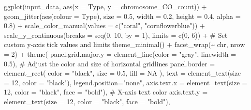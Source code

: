 \documentclass[
  letterpaper,
  DIV=11,
  numbers=noendperiod]{scrreprt}
\newenvironment{Shaded}{\begin{snugshade}}{\end{snugshade}}
\newcommand{\AttributeTok}[1]{\textcolor[rgb]{0.40,0.45,0.13}{#1}}
\newcommand{\CommentTok}[1]{\textcolor[rgb]{0.37,0.37,0.37}{#1}}
\newcommand{\ConstantTok}[1]{\textcolor[rgb]{0.56,0.35,0.01}{#1}}
\newcommand{\DecValTok}[1]{\textcolor[rgb]{0.68,0.00,0.00}{#1}}
\newcommand{\FloatTok}[1]{\textcolor[rgb]{0.68,0.00,0.00}{#1}}
\newcommand{\FunctionTok}[1]{\textcolor[rgb]{0.28,0.35,0.67}{#1}}
\newcommand{\NormalTok}[1]{\textcolor[rgb]{0.00,0.23,0.31}{#1}}
\newcommand{\SpecialCharTok}[1]{\textcolor[rgb]{0.37,0.37,0.37}{#1}}
\newcommand{\StringTok}[1]{\textcolor[rgb]{0.13,0.47,0.30}{#1}}
\begin{document}
\begin{codelisting}
\begin{Shaded}
\begin{Highlighting}[]
\FunctionTok{ggplot}\NormalTok{(input\_data, }\FunctionTok{aes}\NormalTok{(}\AttributeTok{x =}\NormalTok{ Type, }\AttributeTok{y =}\NormalTok{ chromosome\_CO\_count)) }\SpecialCharTok{+} 
  \FunctionTok{geom\_jitter}\NormalTok{(}\FunctionTok{aes}\NormalTok{(}\AttributeTok{colour =}\NormalTok{ Type), }\AttributeTok{size =} \FloatTok{0.5}\NormalTok{, }\AttributeTok{width =} \FloatTok{0.2}\NormalTok{, }\AttributeTok{height =} \FloatTok{0.4}\NormalTok{, }\AttributeTok{alpha =} \FloatTok{0.8}\NormalTok{) }\SpecialCharTok{+} 
  \FunctionTok{scale\_color\_manual}\NormalTok{(}\AttributeTok{values =} \FunctionTok{c}\NormalTok{(}\StringTok{"coral"}\NormalTok{, }\StringTok{"cornflowerblue"}\NormalTok{)) }\SpecialCharTok{+}
  \FunctionTok{scale\_y\_continuous}\NormalTok{(}\AttributeTok{breaks =} \FunctionTok{seq}\NormalTok{(}\DecValTok{0}\NormalTok{, }\DecValTok{10}\NormalTok{, }\AttributeTok{by =} \DecValTok{1}\NormalTok{), }\AttributeTok{limits =} \FunctionTok{c}\NormalTok{(}\DecValTok{0}\NormalTok{, }\DecValTok{6}\NormalTok{)) }\SpecialCharTok{+}  \CommentTok{\# Set custom y{-}axis tick values and limits}
  \FunctionTok{theme\_minimal}\NormalTok{() }\SpecialCharTok{+}
  \FunctionTok{facet\_wrap}\NormalTok{(}\SpecialCharTok{\textasciitilde{}}\NormalTok{ chr, }\AttributeTok{nrow =} \DecValTok{2}\NormalTok{) }\SpecialCharTok{+}
  \FunctionTok{theme}\NormalTok{(}
    \AttributeTok{panel.grid.major.y =} \FunctionTok{element\_line}\NormalTok{(}\AttributeTok{color =} \StringTok{"gray"}\NormalTok{, }\AttributeTok{linewidth =} \FloatTok{0.5}\NormalTok{),  }\CommentTok{\# Adjust the color and size of horizontal gridlines}
    \AttributeTok{panel.border =} \FunctionTok{element\_rect}\NormalTok{(}
      \AttributeTok{color =} \StringTok{"black"}\NormalTok{,}
      \AttributeTok{size =} \FloatTok{0.5}\NormalTok{,}
      \AttributeTok{fill =} \ConstantTok{NA}
\NormalTok{    ),}
    \AttributeTok{text =} \FunctionTok{element\_text}\NormalTok{(}\AttributeTok{size =} \DecValTok{12}\NormalTok{, }\AttributeTok{color =} \StringTok{"black"}\NormalTok{),}
    \AttributeTok{legend.position=}\StringTok{"none"}\NormalTok{,}
    \AttributeTok{axis.text.x =} \FunctionTok{element\_text}\NormalTok{(}\AttributeTok{size =} \DecValTok{12}\NormalTok{, }\AttributeTok{color =} \StringTok{"black"}\NormalTok{, }\AttributeTok{face =} \StringTok{"bold"}\NormalTok{),  }\CommentTok{\# X{-}axis text color}
    \AttributeTok{axis.text.y =} \FunctionTok{element\_text}\NormalTok{(}\AttributeTok{size =} \DecValTok{12}\NormalTok{, }\AttributeTok{color =} \StringTok{"black"}\NormalTok{, }\AttributeTok{face =} \StringTok{"bold"}\NormalTok{),}

\end{Highlighting}
\end{Shaded}
\end{codelisting}
\end{document}
